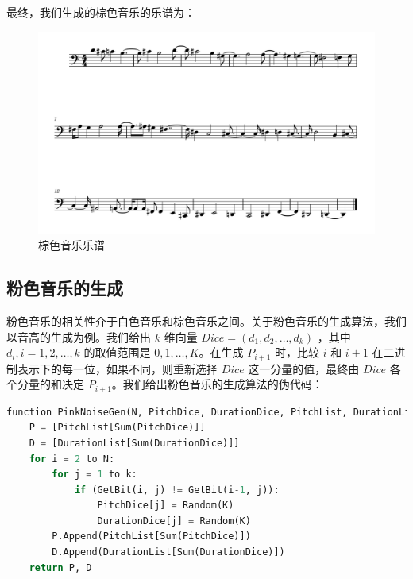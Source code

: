 \documentclass[a4paper,12pt]{article} %
\begin{document}
最终，我们生成的棕色音乐的乐谱为：
\begin{figure}[H]
    \centering
    \includegraphics[width=1.0\linewidth]{images/brown.png}
    \caption{棕色音乐乐谱}
    \label{fig:enter-label}
\end{figure}

\subsection{粉色音乐的生成}

粉色音乐的相关性介于白色音乐和棕色音乐之间。关于粉色音乐的生成算法，我们以音高的生成为例。我们给出 $k$ 维向量 $Dice = (d_1, d_2, \ldots, d_k)$ ，其中 $d_i, i = 1, 2, \ldots, k$ 的取值范围是 $0, 1,\ldots, K$。在生成 $P_{i+1}$ 时，比较 $i$ 和 $i+1$ 在二进制表示下的每一位，如果不同，则重新选择 $Dice$ 这一分量的值，最终由 $Dice$ 各个分量的和决定 $P_{i+1}$。我们给出粉色音乐的生成算法的伪代码：
\begin{lstlisting}[language=python]
function PinkNoiseGen(N, PitchDice, DurationDice, PitchList, DurationList):
    P = [PitchList[Sum(PitchDice)]]
    D = [DurationList[Sum(DurationDice)]]
    for i = 2 to N:
        for j = 1 to k:
            if (GetBit(i, j) != GetBit(i-1, j)):
                PitchDice[j] = Random(K)
                DurationDice[j] = Random(K)
        P.Append(PitchList[Sum(PitchDice)])
        D.Append(DurationList[Sum(DurationDice)])
    return P, D
\end{lstlisting}
\end{document}
